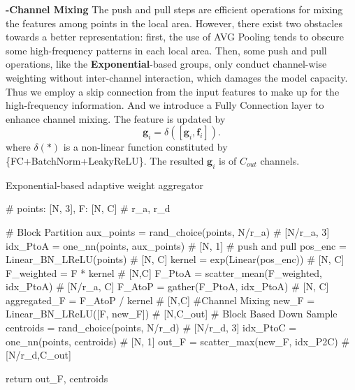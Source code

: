 \documentclass[journal]{IEEEtran}
\begin{document}
\noindent
{\bf -Channel Mixing} The push and pull steps are efficient operations for mixing the features among points in the local area. However, there exist two obstacles towards a better representation: first, the use of AVG Pooling tends to obscure some high-frequency patterns in each local area. Then, some push and pull operations, like the {\bf Exponential}-based groups, only conduct channel-wise weighting without inter-channel interaction, which damages the model capacity. Thus we employ a skip connection from the input features to make up for the high-frequency information. And we introduce a Fully Connection layer to enhance channel mixing. The feature is updated by 
\begin{equation}
	\mathbf{g}_{i} = \delta([\mathbf{g}_i, \mathbf{f}_i]).
\end{equation}
where $\delta(*)$ is a non-linear function constituted by \{FC+BatchNorm+LeakyReLU\}. The resulted $\mathbf{g}_i$ is of $C_{out}$ channels.

\begin{algorithm}[t]
  \caption{Exponential-based adaptive weight aggregator}
  \begin{algorithmic}\label{alg:expaw}
  \STATE
    \begin{python}
    # points: [N, 3], F: [N, C]
    # r_a, r_d
    
    # Block Partition
    aux_points = rand_choice(points, N/r_a) 
                                # [N/r_a, 3]
    idx_PtoA = one_nn(points, aux_points) 
                                    # [N, 1]
    # push and pull
    pos_enc = Linear_BN_LReLU(points) # [N, C]
    kernel = exp(Linear(pos_enc)) # [N, C]
    F_weighted = F * kernel # [N,C]
    F_PtoA = scatter_mean(F_weighted, idx_PtoA) 
                                    # [N/r_a, C]
    F_AtoP = gather(F_PtoA, idx_PtoA) # [N, C]
    aggregated_F = F_AtoP / kernel # [N,C]
    #Channel Mixing
    new_F = Linear_BN_LReLU([F, new_F]) 
                            # [N,C_out]
    # Block Based Down Sample
    centroids = rand_choice(points, N/r_d) 
                                # [N/r_d, 3]
    idx_PtoC = one_nn(points, centroids) 
                                    # [N, 1]
    out_F = scatter_max(new_F, idx_P2C) 
                        # [N/r_d,C_out]
    
    return out_F, centroids
    \end{python}
  \end{algorithmic}
\end{algorithm}
\end{document}
